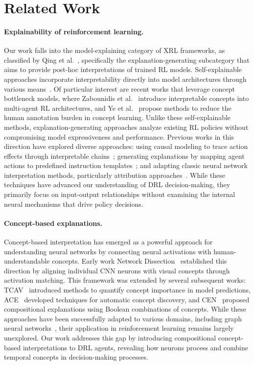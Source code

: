 \section{Related Work}
\paragraph{Explainability of reinforcement learning.} Our work falls into the model-explaining category of XRL frameworks, as classified by Qing et al.~\cite{qing2023surveyexplainablereinforcementlearning}, specifically the explanation-generating subcategory that aims to provide post-hoc interpretations of trained RL models. Self-explainable approaches incorporate interpretability directly into model architectures through various means~\cite{liu2019lmut,verma2018programmatically,landajuela2021discovering,delfosse2024interpretable,payani2020incorporating}. Of particular interest are recent works that leverage concept bottleneck models, where Zabounidis et al.~\cite{zabounidis2023concept} introduce interpretable concepts into multi-agent RL architectures, and Ye et al.~\cite{ye2024conceptbased} propose methods to reduce the human annotation burden in concept learning. Unlike these self-explainable methods, explanation-generating approaches analyze existing RL policies without compromising model expressiveness and performance. Previous works in this direction have explored diverse approaches: using causal modeling to trace action effects through interpretable chains~\cite{yu2023causal}; generating explanations by mapping agent actions to predefined instruction templates~\cite{boggess2023explainable,hayes2017improving}; and adapting classic neural network interpretation methods, particularly attribution approaches~\cite{nikulin2019free,rizzo2019reinforcement,joo2019visualization,shi2020self}. While these techniques have advanced our understanding of DRL decision-making, they primarily focus on input-output relationships without examining the internal neural mechanisms that drive policy decisions.

\paragraph{Concept-based explanations.} Concept-based interpretation has emerged as a powerful approach for understanding neural networks by connecting neural activations with human-understandable concepts. Early work Network Dissection~\cite{bau2017network} established this direction by aligning individual CNN neurons with visual concepts through activation matching. This framework was extended by several subsequent works: TCAV~\cite{kim2018interpretability} introduced methods to quantify concept importance in model predictions, ACE~\cite{ghorbani2019towards} developed techniques for automatic concept discovery, and CEN~\cite{mu2020compositional} proposed compositional explanations using Boolean combinations of concepts. While these approaches have been successfully adapted to various domains, including graph neural networks~\cite{xuanyuan2023global}, their application in reinforcement learning remains largely unexplored. Our work addresses this gap by introducing compositional concept-based interpretations to DRL agents, revealing how neurons process and combine temporal concepts in decision-making processes.